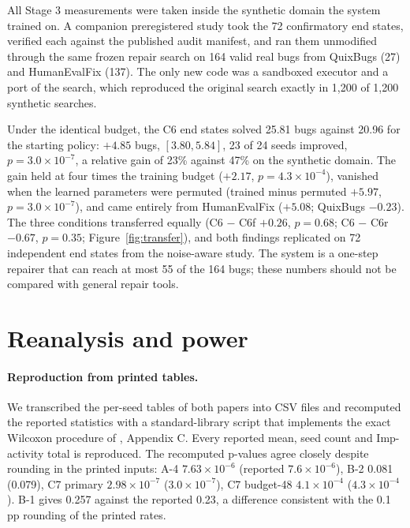 \documentclass[11pt]{article}
\begin{document}
All Stage 3 measurements were taken inside the synthetic domain the system trained on. A companion preregistered study \cite{felix2026c7} took the 72 confirmatory end states, verified each against the published audit manifest, and ran them unmodified through the same frozen repair search on 164 valid real bugs from QuixBugs \cite{lin2017quixbugs} (27) and HumanEvalFix \cite{muennighoff2024octopack} (137). The only new code was a sandboxed executor and a port of the search, which reproduced the original search exactly in 1,200 of 1,200 synthetic searches.

Under the identical budget, the C6 end states solved 25.81 bugs against 20.96 for the starting policy: $+4.85$ bugs, $[3.80, 5.84]$, 23 of 24 seeds improved, $p = 3.0\times10^{-7}$, a relative gain of 23\% against 47\% on the synthetic domain. The gain held at four times the training budget ($+2.17$, $p = 4.3\times10^{-4}$), vanished when the learned parameters were permuted (trained minus permuted $+5.97$, $p = 3.0\times10^{-7}$), and came entirely from HumanEvalFix ($+5.08$; QuixBugs $-0.23$). The three conditions transferred equally (C6 $-$ C6f $+0.26$, $p = 0.68$; C6 $-$ C6r $-0.67$, $p = 0.35$; Figure~\ref{fig:transfer}), and both findings replicated on 72 independent end states from the noise-aware study. The system is a one-step repairer that can reach at most 55 of the 164 bugs; these numbers should not be compared with general repair tools.

\section{Reanalysis and power}\label{sec:reanalysis}

\paragraph{Reproduction from printed tables.} We transcribed the per-seed tables of both papers into CSV files and recomputed the reported statistics with a standard-library script that implements the exact Wilcoxon procedure of \cite{felix2026c3}, Appendix C. Every reported mean, seed count and Imp-activity total is reproduced. The recomputed p-values agree closely despite rounding in the printed inputs: A-4 $7.63\times10^{-6}$ (reported $7.6\times10^{-6}$), B-2 0.081 (0.079), C7 primary $2.98\times10^{-7}$ ($3.0\times10^{-7}$), C7 budget-48 $4.1\times10^{-4}$ ($4.3\times10^{-4}$). B-1 gives 0.257 against the reported 0.23, a difference consistent with the 0.1 pp rounding of the printed rates.
\end{document}
